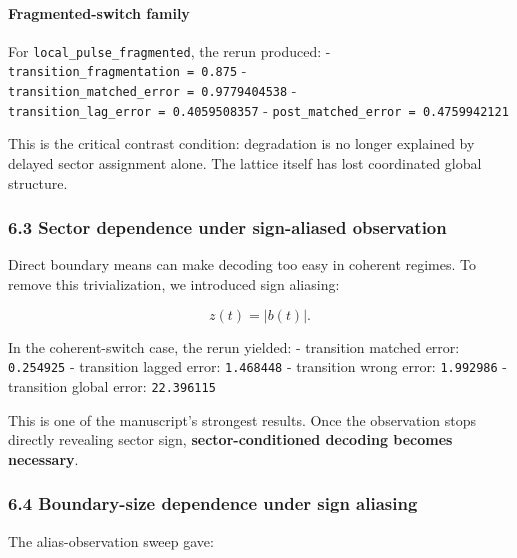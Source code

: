 \documentclass[
]{article}
\begin{document}
\paragraph{Fragmented-switch family}\label{fragmented-switch-family}

For \texttt{local\_pulse\_fragmented}, the rerun produced: -
\texttt{transition\_fragmentation\ =\ 0.875} -
\texttt{transition\_matched\_error\ =\ 0.9779404538} -
\texttt{transition\_lag\_error\ =\ 0.4059508357} -
\texttt{post\_matched\_error\ =\ 0.4759942121}

This is the critical contrast condition: degradation is no longer
explained by delayed sector assignment alone. The lattice itself has
lost coordinated global structure.

\subsubsection{6.3 Sector dependence under sign-aliased
observation}\label{sector-dependence-under-sign-aliased-observation}

Direct boundary means can make decoding too easy in coherent regimes. To
remove this trivialization, we introduced sign aliasing:

\[
z(t)=|b(t)|.
\]

In the coherent-switch case, the rerun yielded: - transition matched
error: \texttt{0.254925} - transition lagged error: \texttt{1.468448} -
transition wrong error: \texttt{1.992986} - transition global error:
\texttt{22.396115}

This is one of the manuscript's strongest results. Once the observation
stops directly revealing sector sign, \textbf{sector-conditioned
decoding becomes necessary}.

\subsubsection{6.4 Boundary-size dependence under sign
aliasing}\label{boundary-size-dependence-under-sign-aliasing}

The alias-observation sweep gave:
\end{document}
